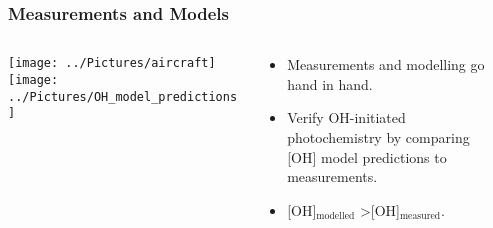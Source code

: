 \begin{frame}
    \frametitle{Measurements and Models}
    \vspace{-6mm}

    \begin{columns}[onlytextwidth]
        \begin{column}{0.4\textwidth}
            \begin{center}
                \texttt{[image: ../Pictures/aircraft]} \\ \vspace{-3mm}
                \hbox{}
                \vspace{5mm}
                \texttt{[image: ../Pictures/OH\_model\_predictions]} \\ \vspace{-3mm}
                \hbox{}
            \end{center}
        \end{column}%
        \begin{column}{0.6\textwidth}
            \begin{itemize}
                \item Measurements and modelling go hand in hand. \vspace{3mm}
                \item Verify OH-initiated \\photochemistry by comparing \\ {[OH]} model predictions to measurements. \vspace{1mm}
                \item {[OH]}$_{\text{modelled}}$ \textgreater [OH]$_{\text{measured}}$.
            \end{itemize}
        \end{column}
    \end{columns}

\end{frame}
